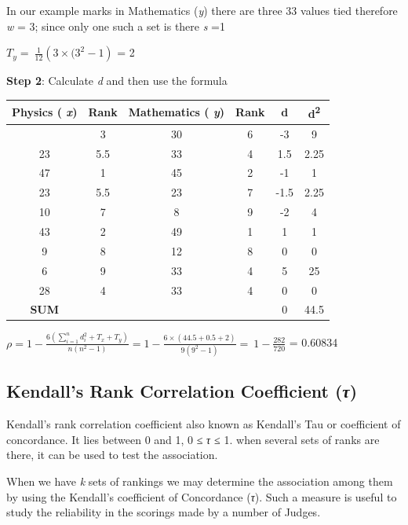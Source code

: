 \documentclass[
]{book}
\begin{document}
In our example marks in Mathematics (\emph{y}) there are three 33 values tied
therefore \emph{w} = 3; since only one such a set is there \emph{s} =1

\(T_{y} = \ \frac{1}{12}\left( 3 \times (3^{2} - 1 \right)\) = 2

\textbf{Step 2}: Calculate \emph{d} and then use the formula

\begin{longtable}[]{@{}cccccc@{}}
\toprule\noalign{}
Physics ( \emph{x}) & Rank & Mathematics ( \emph{y}) & Rank & d & d\textsuperscript{2} \\
\midrule\noalign{}
\endhead
\bottomrule\noalign{}
\endlastfoot
35 & 3 & 30 & 6 & -3 & 9 \\
23 & 5.5 & 33 & 4 & 1.5 & 2.25 \\
47 & 1 & 45 & 2 & -1 & 1 \\
23 & 5.5 & 23 & 7 & -1.5 & 2.25 \\
10 & 7 & 8 & 9 & -2 & 4 \\
43 & 2 & 49 & 1 & 1 & 1 \\
9 & 8 & 12 & 8 & 0 & 0 \\
6 & 9 & 33 & 4 & 5 & 25 \\
28 & 4 & 33 & 4 & 0 & 0 \\
\textbf{SUM} & & & & 0 & 44.5 \\
\end{longtable}

\(\rho = 1 - \frac{6\left( \sum_{i = 1}^{n}d_{i}^{2} + T_{x} + T_{y} \right)}{n\left( n^{2} - 1 \right)} = 1 - \frac{6 \times \left( 44.5 + 0.5 + 2 \right)}{9\left( 9^{2} - 1 \right)} = \ 1 - \frac{282}{720}\)
= 0.60834

\hypertarget{kendalls-rank-correlation-coefficient-ux3c4}{%
\subsection{\texorpdfstring{Kendall's Rank Correlation Coefficient (\emph{τ})}{Kendall's Rank Correlation Coefficient (τ)}}\label{kendalls-rank-correlation-coefficient-ux3c4}}

Kendall's rank correlation coefficient also known as Kendall's Tau or
coefficient of concordance. It lies between 0 and 1, 0 ≤ \emph{τ ≤} 1. when
several sets of ranks are there, it can be used to test the association.

When we have \emph{k} sets of rankings we may determine the association among
them by using the Kendall's coefficient of Concordance (\emph{τ}). Such a
measure is useful to study the reliability in the scorings made by a
number of Judges.
\end{document}
